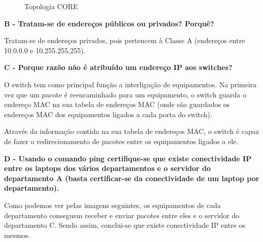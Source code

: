 \documentclass[11pt]{article}
\begin{document}
\begin{figure}[!htb]
    \centering
    \caption{Topologia CORE}
\end{figure}

\clearpage
\textbf{B - Tratam-se de endereços públicos ou privados? Porquê?}

Tratam-se de endereços privados, pois pertencem à Classe A (endereços entre 10.0.0.0 e 10.255.255.255).

\vspace{0.5cm}

\textbf{C - Porque razão não é atribuído um endereço IP aos switches?}

O switch tem como principal função a interligação de equipamentos. Na primeira vez que um pacote é reencaminhado para um equipamento, o switch guarda o endereço MAC na sua tabela de endereços MAC (onde são guardados os endereços MAC dos equipamentos ligados a cada porta do switch).

Através da informação contida na sua tabela de endereços MAC, o switch é capaz de fazer o redirecionamento de pacotes entre os equipamentos ligados a ele.

\vspace{0.5cm}

\textbf{D - Usando o comando ping certifique-se que existe conectividade IP entre os laptops dos vários departamentos e o servidor do departamento A (basta certificar-se da conectividade de um laptop por departamento).}

Como podemos ver pelas imagens seguintes, os equipamentos de cada departamento conseguem receber e enviar pacotes entre eles e o servidor do departamento C. Sendo assim, conclui-se que existe conectividade IP entre os mesmos.
\end{document}
